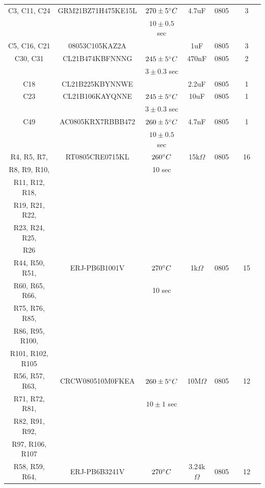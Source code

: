 \documentclass[10pt]{datasheet}
\begin{document}
\begin{longtable}{| c | c | c | c | c | c | c | c |}
    C3, C11, C24 & GRM21BZ71H475KE15L & $270\pm 5\degree C$ & 4.7uF & 0805 & \cite{ref23} & 3 &\\
    & & $10\pm 0.5$ sec & & & & &\\
    \hline
    C5, C16, C21 & 08053C105KAZ2A & & 1uF & 0805 & \cite{ref24} & 3 &\\
    \hline
    C30, C31 & CL21B474KBFNNNG & $245\pm 5\degree C$ & 470nF & 0805 & \cite{ref22} & 2 &\\
    & & $3\pm 0.3$ sec & & & & &\\
    \hline
    C18 & CL21B225KBYNNWE & & 2.2uF & 0805 & \cite{ref26} & 1 & \\
    \hline
    C23 & CL21B106KAYQNNE & $245\pm 5\degree C$ & 10uF & 0805 & \cite{ref22} & 1 & \\
    & & $3\pm 0.3$ sec & & & & &\\
    \hline
    C49 & AC0805KRX7RBBB472 & $260\pm 5\degree C$ & 4.7nF & 0805 & \cite{ref25} & 1 &\\
    & & $10\pm 0.5$ sec & & & & &\\
    \hline
    R4, R5, R7, & RT0805CRE0715KL & $260\degree C$ & 15k$\Omega$ & 0805 & \cite{ref27} & 16 &\\
    R8, R9, R10, & & 10 sec & & & & &\\
    R11, R12, R18, & & & & & & &\\
    R19, R21, R22, & & & & & & &\\
    R23, R24, R25, & & & & & & &\\
    R26 & & & & & & &\\
    \hline
    R44, R50, R51, & ERJ-PB6B1001V & $270\degree C$ & 1k$\Omega$ & 0805 & \cite{ref28} & 15 &\\
    R60, R65, R66, & & 10 sec & & & & &\\
    R75, R76, R85, & & & & & & &\\
    R86, R95, R100, & & & & & & &\\
    R101, R102, R105 & & & & & & &\\
    \hline
    R56, R57, R63, & CRCW080510M0FKEA & $260\pm 5\degree C$ & 10M$\Omega$ & 0805 & \cite{ref29} & 12 &\\
    R71, R72, R81, & & $10\pm 1$ sec & & & & &\\
    R82, R91, R92, & & & & & & &\\
    R97, R106, R107 & & & & & & &\\
    \hline
    R58, R59, R64, & ERJ-PB6B3241V & $270\degree C$ & 3.24k$\Omega$ & 0805 & \cite{ref28} & 12 &\\

\end{longtable}
\end{document}
